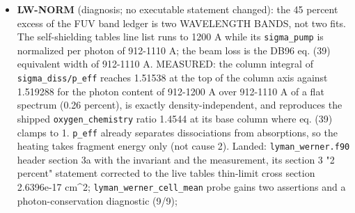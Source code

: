 \documentclass[english,a4paper]{my_memo}
\begin{document}
\begin{itemize}
  rows mass 2.6e-13, momentum 1.3e-9, energy 6.275e-10); the PTC route stalls
  from a cold start; \texttt{wasp\_he23off\_newton}, \texttt{newton\_rsw01}, \texttt{newton\_rsw05} at
  the default 1e-5 refuse on the mass and momentum rows at cell 499; the four
  \texttt{Load\ IC} Newton cases (\texttt{jfnk\_hd189}, \texttt{jfnk\_hd189\_tight}, \texttt{ptc\_warm},
  \texttt{armD\_D2\_newton}) are stopped by the grid guard and need their IC
  regenerated on the current grid before they can be measured.
  \textbf{Applied:} \texttt{cert\_tol\_energy} 5e-5 -\textgreater{} 1e-6 in \texttt{certification.f90} (5e-5
  had been anchored on the lagged-gate energy row 4.700e-06 and could refuse
  nothing; 1e-6 is a decade above 1.212e-07, the largest energy row of any
  state whose solve met its own target, 5.7e4x above the floor 1.765e-11);
  mass 3e-12 and momentum 1e-8 kept; the report header now names sections 9
  and 10. \texttt{backup/regression/wasp\_full\_newton/input.inp} gains \texttt{Resid\ tol:\ 1.0e-8} as its configuration of record, the only setting at which that case
  certifies (Mdot unchanged at this precision, cost +11 percent); its golden
  moves at the series gate with everything else. Verified: private build,
  \texttt{certification} suite green (29 assertions). Not changed: the other three
  Newton cases stay at the default so that the matrix keeps a refused claim
  (exit 2) under test.
\item
  \textbf{LW-NORM} (diagnosis; no executable statement changed): the 45 percent
  excess of the FUV band ledger is two WAVELENGTH BANDS, not two fits. The
  self-shielding table\textquotesingle s line list runs to 1200 A while its \texttt{sigma\_pump} is
  normalized per photon of 912-1110 A; the beam loss is the DB96 eq. (39)
  equivalent width of 912-1110 A. MEASURED: the column integral of
  \texttt{sigma\_diss/p\_eff} reaches 1.51538 at the top of the column axis against
  1.519288 for the photon content of 912-1200 A over 912-1110 A of a flat
  spectrum (0.26 percent), is exactly density-independent, and reproduces
  the shipped \texttt{oxygen\_chemistry} ratio 1.4544 at its base column where eq.
  (39) clamps to 1. \texttt{p\_eff} already separates dissociations from
  absorptions, so the heating takes fragment energy only (not cause 2).
  Landed: \texttt{lyman\_werner.f90} header section 3a with the invariant and the
  measurement, its section 3 "2 percent" statement corrected to the live
  table\textquotesingle s thin-limit cross section 2.6396e-17 cm\^{}2; \texttt{lyman\_werner\_cell\_mean}
  probe gains two assertions and a photon-conservation diagnostic (9/9);

\end{itemize}
\end{document}
